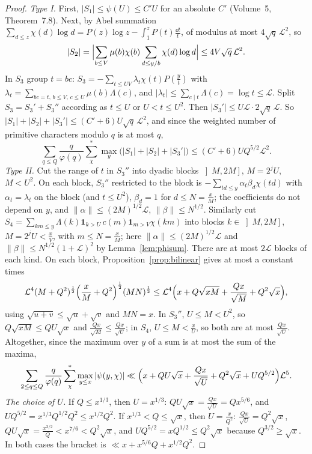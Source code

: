 \begin{proof}
\emph{Type I.} First, $|S_1|\le\psi(U)\le C'U$ for an absolute $C'$ (Volume~5, Theorem~7.8). Next, by Abel summation $\sum_{d\le z}\chi(d)\log d=P(z)\log z-\int_1^zP(t)\frac{\dd t}t$, of modulus at most $4\sqrt q\,\mathcal L^2$, so
\[
|S_2|=\Bigl|\sum_{b\le V}\mu(b)\chi(b)\sum_{d\le y/b}\chi(d)\log d\Bigr|\le4V\sqrt q\,\mathcal L^2.
\]
In $S_3$ group $t=bc$: $S_3=-\sum_{t\le UV}\lambda_t\chi(t)P(\frac yt)$ with $\lambda_t=\sum_{bc=t,\,b\le V,\,c\le U}\mu(b)\Lambda(c)$, and $|\lambda_t|\le\sum_{c\mid t}\Lambda(c)=\log t\le\mathcal L$. Split $S_3=S_3'+S_3''$ according as $t\le U$ or $U<t\le U^2$. Then $|S_3'|\le U\mathcal L\cdot2\sqrt q\,\mathcal L$. So $|S_1|+|S_2|+|S_3'|\le(C'+6)U\sqrt q\,\mathcal L^2$, and since the weighted number of primitive characters modulo $q$ is at most $q$,
\[
\sum_{q\le Q}\frac q{\varphi(q)}\sum^*_\chi\max_y\bigl(|S_1|+|S_2|+|S_3'|\bigr)\le(C'+6)UQ^{5/2}\mathcal L^2.
\]
\emph{Type II.} Cut the range of $t$ in $S_3''$ into dyadic blocks $\left]M,2M\right]$, $M=2^jU$, $M<U^2$. On each block, $S_3''$ restricted to the block is $-\sum_{td\le y}\alpha_t\beta_d\chi(td)$ with $\alpha_t=\lambda_t$ on the block (and $t\le U^2$), $\beta_d=1$ for $d\le N=\frac xM$; the coefficients do not depend on $y$, and $\|\alpha\|\le(2M)^{1/2}\mathcal L$, $\|\beta\|\le N^{1/2}$. Similarly cut $S_4=\sum_{km\le y}\Lambda(k)\mathbf 1_{k>U}\,c(m)\mathbf 1_{m>V}\chi(km)$ into blocks $k\in\left]M,2M\right]$, $M=2^jU<\frac xV$, with $m\le N=\frac xM$; here $\|\alpha\|\le(2M)^{1/2}\mathcal L$ and $\|\beta\|\le N^{1/2}(1+\mathcal L)^2$ by Lemma~\ref{lem:phisum}. There are at most $2\mathcal L$ blocks of each kind. On each block, Proposition~\ref{prop:bilinear} gives at most a constant times
\[
\mathcal L^4(M+Q^2)^{\frac12}\Bigl(\frac xM+Q^2\Bigr)^{\frac12}(MN)^{\frac12}\le\mathcal L^4\Bigl(x+Q\sqrt{xM}+\frac{Qx}{\sqrt M}+Q^2\sqrt x\Bigr),
\]
using $\sqrt{u+v}\le\sqrt u+\sqrt v$ and $MN=x$. In $S_3''$, $U\le M<U^2$, so $Q\sqrt{xM}\le QU\sqrt x$ and $\frac{Qx}{\sqrt M}\le\frac{Qx}{\sqrt U}$; in $S_4$, $U\le M<\frac xU$, so both are at most $\frac{Qx}{\sqrt U}$. Altogether, since the maximum over $y$ of a sum is at most the sum of the maxima,
\[
\sum_{2\le q\le Q}\frac q{\varphi(q)}\sum^*_\chi\max_{y\le x}|\psi(y,\chi)|\ll\Bigl(x+QU\sqrt x+\frac{Qx}{\sqrt U}+Q^2\sqrt x+UQ^{5/2}\Bigr)\mathcal L^5.
\]
\emph{The choice of $U$.} If $Q\le x^{1/3}$, then $U=x^{1/3}$: $QU\sqrt x=\frac{Qx}{\sqrt U}=Qx^{5/6}$, and $UQ^{5/2}=x^{1/3}Q^{1/2}Q^2\le x^{1/2}Q^2$. If $x^{1/3}<Q\le\sqrt x$, then $U=\frac x{Q^2}$: $\frac{Qx}{\sqrt U}=Q^2\sqrt x$, $QU\sqrt x=\frac{x^{3/2}}Q<x^{7/6}<Q^2\sqrt x$, and $UQ^{5/2}=xQ^{1/2}\le Q^2\sqrt x$ because $Q^{3/2}\ge\sqrt x$. In both cases the bracket is $\ll x+x^{5/6}Q+x^{1/2}Q^2$.
\end{proof}

